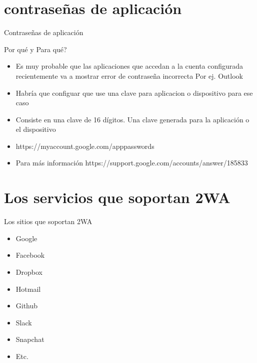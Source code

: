 \documentclass[11pt]{beamer}
\begin{document}
\section{contrase\~nas de aplicaci\'on}
\begin{frame}{Contrase\~nas de aplicaci\'on}
  \begin{block}{Por qu\'e y Para qu\'e?}
    \begin{itemize}
    	\item Es muy probable que las aplicaciones que accedan a la cuenta configurada recientemente va a mostrar error de contrase\~na incorrecta Por ej. Outlook
    	\item Habr\'ia que configuar que use una clave para aplicacion o dispositivo para ese caso
    	\item Consiste en una clave de 16 d\'igitos. Una clave generada para la aplicaci\'on o el dispositivo
    	\item https://myaccount.google.com/apppasswords 
    	\item Para m\'as informaci\'on https://support.google.com/accounts/answer/185833
    \end{itemize}
  \end{block}
\end{frame}
\section{Los servicios que soportan 2WA}
\begin{frame}
  \begin{block}{Los sitios que soportan 2WA}
    \begin{itemize}
      \item Google
      \item Facebook
      \item Dropbox
      \item Hotmail
      \item Github
      \item Slack
      \item Snapchat
      \item Etc.
    \end{itemize}
  \end{block}
\end{frame}
\end{document}
